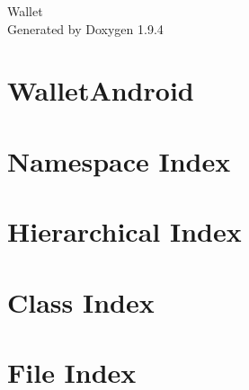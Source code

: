 \documentclass[twoside]{book}
\newcommand{\+}{\discretionary{\mbox{\scriptsize$\hookleftarrow$}}{}{}}
\newcommand{\clearemptydoublepage}{%
    \newpage{\pagestyle{empty}\cleardoublepage}%
  }
\begin{document}
  \raggedbottom
    \hypersetup{pageanchor=false,
                bookmarksnumbered=true,
                pdfencoding=unicode
               }
  \begin{titlepage}
  \vspace*{7cm}
  \begin{center}%
  {\Large Wallet}\\
  \vspace*{1cm}
  {\large Generated by Doxygen 1.9.4}\\
  \end{center}
  \end{titlepage}
  \clearemptydoublepage
  \tableofcontents
  \clearemptydoublepage
  \hypersetup{pageanchor=true}
\chapter{Wallet\+Android}
\label{md__r_e_a_d_m_e}

\chapter{Namespace Index}

\chapter{Hierarchical Index}

\chapter{Class Index}

\chapter{File Index}

\end{document}
